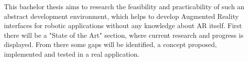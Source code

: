This bachelor thesis aims to research the feasibility and practicability of such an abstract development environment, which helps to develop Augmented Reality interfaces for robotic applications without any knowledge about AR itself. First there will be a "State of the Art" section, where current research and progress is displayed. From there some gaps will be identified, a concept proposed, implemented and tested in a real application.




























